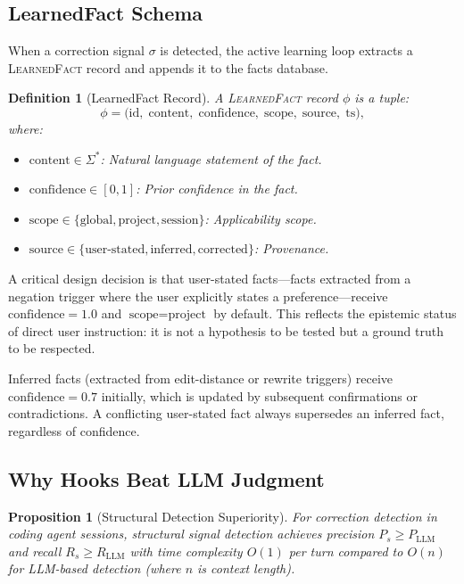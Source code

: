 \documentclass[11pt]{article}
\newtheorem{proposition}[theorem]{Proposition}
\newtheorem{definition}{Definition}
\begin{document}
\subsection{LearnedFact Schema}

When a correction signal $\sigma$ is detected, the active learning loop
extracts a \textsc{LearnedFact} record and appends it to the facts database.

\begin{definition}[LearnedFact Record]
\label{def:learned_fact}
A \textsc{LearnedFact} record $\phi$ is a tuple:
\begin{equation}
\phi = \bigl( \text{id},\; \text{content},\; \text{confidence},\;
              \text{scope},\; \text{source},\; \text{ts} \bigr),
\end{equation}
where:
\begin{itemize}[leftmargin=1.5em, nosep]
    \item $\text{content} \in \Sigma^*$: Natural language statement of the fact.
    \item $\text{confidence} \in [0, 1]$: Prior confidence in the fact.
    \item $\text{scope} \in \{\text{global}, \text{project}, \text{session}\}$: Applicability scope.
    \item $\text{source} \in \{\text{user-stated}, \text{inferred}, \text{corrected}\}$: Provenance.
\end{itemize}
\end{definition}

A critical design decision is that user-stated facts---facts extracted from
a negation trigger where the user explicitly states a preference---receive
$\text{confidence} = 1.0$ and $\text{scope} = \text{project}$ by default.
This reflects the epistemic status of direct user instruction: it is not a
hypothesis to be tested but a ground truth to be respected.

Inferred facts (extracted from edit-distance or rewrite triggers) receive
$\text{confidence} = 0.7$ initially, which is updated by subsequent
confirmations or contradictions. A conflicting user-stated fact always
supersedes an inferred fact, regardless of confidence.

\subsection{Why Hooks Beat LLM Judgment}

\begin{proposition}[Structural Detection Superiority]
\label{prop:structural_detection}
For correction detection in coding agent sessions, structural signal detection
achieves precision $P_s \geq P_{\text{LLM}}$ and recall $R_s \geq R_{\text{LLM}}$
with time complexity $O(1)$ per turn compared to $O(n)$ for LLM-based detection
(where $n$ is context length).
\end{proposition}
\end{document}
